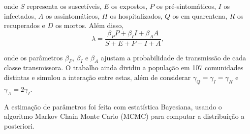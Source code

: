 \documentclass{article}
\begin{document}
\noindent onde $S$ representa os suscetíveis, $E$ os expostos, $P$ os pré-sintomáticos, $I$ os infectados, $A$ os assintomáticos, $H$ os hospitalizados, $Q$ os em quarentena, $R$ os recuperados e $D$ os mortos. Além disso, 
\[\lambda = \frac{\beta_P P + \beta_I I + \beta_A A}{S + E + P + I + A},\]

\noindent onde os parâmetros $\beta_P$, $\beta_I$ e $\beta_A$ ajustam a probabilidade de transmissão de cada classe transmissora. O trabalho ainda dividiu a população em 107 comunidades distintas e simulou a interação entre estas, além de considerar $\gamma_Q = \gamma_I = \gamma_H$ e $\gamma_A = 2\gamma_I$.

A estimação de parâmetros foi feita com estatística Bayesiana, usando o algoritmo Markov Chain Monte Carlo (MCMC) para computar a distribuição a posteriori.
% 
\end{document}
